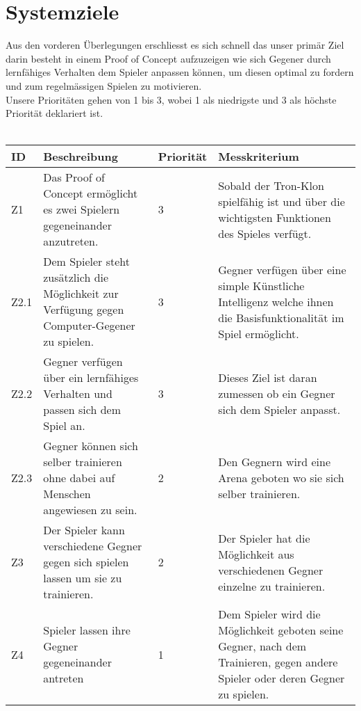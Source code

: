 \section{Systemziele}

Aus den vorderen Überlegungen erschliesst es sich schnell das unser primär Ziel darin besteht in einem Proof of Concept aufzuzeigen wie sich Gegener durch lernfähiges Verhalten dem Spieler anpassen können, um diesen optimal zu fordern und zum regelmässigen Spielen zu motivieren.  
\\ 
Unsere Prioritäten gehen von 1 bis 3, wobei 1 als niedrigste und 3 als höchste Priorität deklariert ist.
\\\\
\begin{tabularx}{\textwidth}{| p{0.7cm} | X | p{1.5cm} | X |}
\hline
\rowcolor[gray]{0.9} ID & Beschreibung & Priorität & Messkriterium\\
\hline
Z1 & Das Proof of Concept ermöglicht es zwei Spielern gegeneinander anzutreten. & 3 & Sobald der Tron-Klon spielfähig ist und über die wichtigsten Funktionen des Spieles verfügt.\\
\hline
Z2.1 & Dem Spieler steht zusätzlich die Möglichkeit zur Verfügung gegen Computer-Gegener zu spielen. & 3 & Gegner verfügen über eine simple Künstliche Intelligenz welche ihnen die Basisfunktionalität im Spiel ermöglicht. \\
\hline
Z2.2 & Gegner verfügen über ein lernfähiges Verhalten und passen sich dem Spiel an. & 3 & Dieses Ziel ist daran zumessen ob ein Gegner sich dem Spieler anpasst. \\
\hline 
Z2.3 & Gegner können sich selber trainieren ohne dabei auf Menschen angewiesen zu sein.  & 2 & Den Gegnern wird eine Arena geboten wo sie sich selber trainieren. \\
\hline
Z3 & Der Spieler kann verschiedene Gegner gegen sich spielen lassen um sie zu trainieren. & 2 & Der Spieler hat die Möglichkeit aus verschiedenen Gegner einzelne zu trainieren. \\
\hline
Z4 & Spieler lassen ihre Gegner gegeneinander antreten & 1 & Dem Spieler wird die Möglichkeit geboten seine Gegner, nach dem Trainieren, gegen andere Spieler oder deren Gegner zu spielen. \\
\hline
\end{tabularx}
